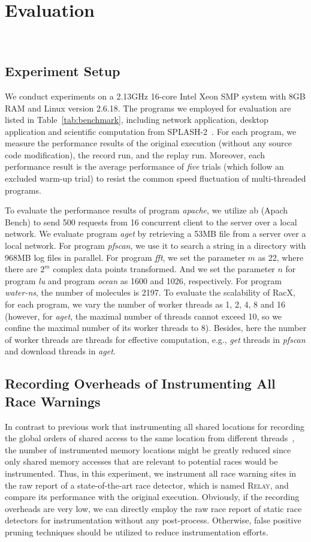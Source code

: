 \documentclass[10pt,onecolumn,letterpaper]{article}
\begin{document}
\section{Evaluation}~\label{sec:experiments}
\subsection{Experiment Setup}
We conduct experiments on a 2.13GHz 16-core Intel Xeon SMP system
with 8GB RAM and Linux version 2.6.18. The programs we employed for
evaluation are listed in Table~\ref{tab:benchmark}, including
network application, desktop application and scientific computation
from SPLASH-2~\cite{Woo95ISCA}. For each program, we measure the
performance results of the original execution (without any source
code modification), the record run, and the replay run. Moreover,
each performance result is the average performance of \emph{five}
trials (which follow an excluded warm-up trial) to resist the common
speed fluctuation of multi-threaded programs.

To evaluate the performance results of program \emph{apache}, we
utilize ab (Apach Bench) to send 500 requests from 16 concurrent
client to the server over a local network. We evaluate program
\emph{aget} by retrieving a 53MB file from a server over a local
network. For program \emph{pfscan}, we use it to search a string in
a directory with 968MB log files in parallel. For program \emph{fft}, we set the parameter $m$ as 22, where there
are $2^m$ complex data points transformed. And we set the parameter
$n$ for program \emph{lu} and program \emph{ocean} as 1600 and 1026,
respectively. For program \emph{water-ns}, the number of molecules
is 2197. To evaluate the scalability of RacX, for each program, we
vary the number of worker threads as 1, 2, 4, 8 and 16 (however, for
\emph{aget}, the maximal number of threads cannot exceed 10, so we
confine the maximal number of its worker threads to 8). Besides,
here the number of worker threads are threads for effective
computation, e.g., \emph{get} threads in \emph{pfscan} and download
threads in \emph{aget}.

\subsection{Recording Overheads of Instrumenting All Race Warnings}
In contrast to previous work that instrumenting all shared locations
for recording the global orders of shared access to the same
location from different
threads~\cite{Narayanasamy06SIGMETRICS,Patil10CGO}, the number of
instrumented memory locations might be greatly reduced since only
shared memory accesses that are relevant to potential races would be
instrumented. Thus, in this experiment, we instrument all race
warning sites in the raw report of a state-of-the-art race detector,
which is named R\textsc{elay}, and compare its performance with the
original execution. Obviously, if the recording overheads are very
low, we can directly employ the raw race report of static race
detectors for instrumentation without any post-process. Otherwise,
false positive pruning techniques should be utilized to reduce
instrumentation efforts.
\end{document}
